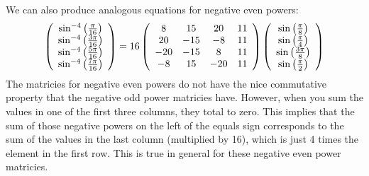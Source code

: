 \documentclass[fleqn,a4paper,9pt]{article}
\begin{document}
\begin{flushleft}
We can also produce analogous equations for negative even powers:
\begin{equation}\notag
\left(
\begin{array}{c}
\sin^{-4}\left(\frac{\pi}{16}\right)   \\
\sin^{-4}\left(\frac{3\pi}{16}\right)  \\
\sin^{-4}\left(\frac{5\pi}{16}\right)  \\
\sin^{-4}\left(\frac{7\pi}{16}\right)  \\
\end{array}
\right)
=16\left(
\begin{array}{cccc}
 8 & 15 & 20 & 11 \\
 20 & -15 & -8 & 11 \\
 -20& -15 & 8 & 11 \\
 -8 & 15 & -20 & 11 \\
\end{array}
\right)
\left(
\begin{array}{c}
\sin\left(\frac{\pi}{8}\right)   \\
\sin\left(\frac{\pi}{4}\right)  \\
\sin\left(\frac{3\pi}{8}\right)  \\
\sin\left(\frac{\pi}{2}\right)  \\
\end{array}
\right)
\end{equation}
The matricies for negative even powers do not have the nice commutative property that the negative odd power matricies have. However, when you sum the values in one of the first three columns, they total to zero. This implies that the sum of those negative powers on the left of the equals sign corresponds to the sum of the values in the last column (multiplied by 16), which is just 4 times the element in the first row. This is true in general for these negative even power matricies. 
\par
\begin{lemma}


\end{lemma}
\end{flushleft}
\end{document}
